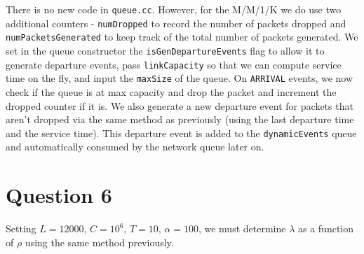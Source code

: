 \documentclass{article}
\begin{document}
There is no new code in \texttt{queue.cc}. However, for the M/M/1/K we do use two additional counters - \texttt{numDropped} to record the number of packets dropped
and \texttt{numPacketsGenerated} to keep track of the total number of packets generated. We set in the queue constructor the \texttt{isGenDepartureEvents} flag to allow it to generate departure events,
pass \texttt{linkCapacity} so that we can compute service time on the fly, and input the \texttt{maxSize} of the queue.
On \texttt{ARRIVAL} events, we now check if the queue is at max capacity and drop the packet and increment the dropped counter if it is. We also generate a new departure
event for packets that aren't dropped via the same method as previously (using the last departure time and the service time). This departure event is added to the \texttt{dynamicEvents} queue
and automatically consumed by the network queue later on.

\section{Question 6}

Setting $L=12000$, $C=10^6$, $T = 10$, $\alpha = 100$, we must determine $\lambda$ as a function of $\rho$ using the same method previously.
\end{document}
